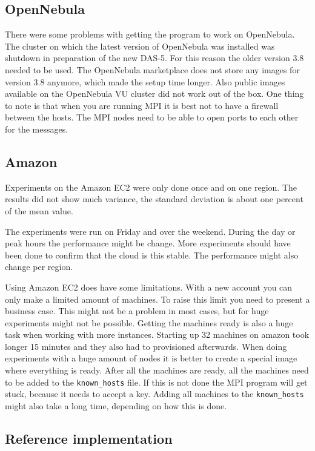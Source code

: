 \subsection{OpenNebula}

There were some problems with getting the program to work on OpenNebula. The cluster on which the latest version of OpenNebula was installed was shutdown in preparation of the new DAS-5. For this reason the older version 3.8 needed to be used. The OpenNebula marketplace does not store any images for version 3.8 anymore, which made the setup time longer. Also public images available on the OpenNebula VU cluster did not work out of the box.
One thing to note is that when you are running MPI it is best not to have a firewall between the hosts. The MPI nodes need to be able to open ports to each other for the messages.  

\subsection{Amazon}
Experiments on the Amazon EC2 were only done once and on one region. The results did not show much variance, the standard deviation is about one percent of the mean value.

The experiments were run on Friday and over the weekend. During the day or peak hours the performance might be change. More experiments should have been done to confirm that the cloud is this stable. The performance might also change per region. 

Using Amazon EC2 does have some limitations. With a new account you can only make a limited amount of machines. To raise this limit you need to present a business case. This might not be a problem in most cases, but for huge experiments might not be possible. Getting the machines ready is also a huge task when working with more instances. Starting up 32 machines on amazon took longer 15 minutes and they also had to provisioned afterwards. When doing experiments with a huge amount of nodes it is better to create a special image where everything is ready. After all the machines are ready, all the machines need to be added to the \texttt{known\_hosts} file. If this is not done the MPI program will get stuck, because it needs to accept a key. Adding all machines to the \texttt{known\_hosts} might also take a long time, depending on how this is done.


\subsection{Reference implementation}


